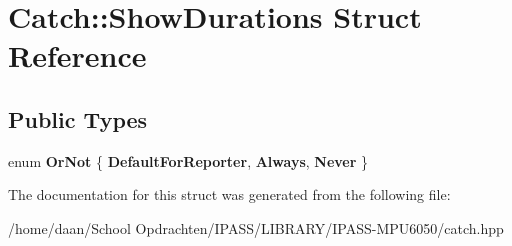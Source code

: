 \hypertarget{structCatch_1_1ShowDurations}{}\section{Catch\+:\+:Show\+Durations Struct Reference}
\label{structCatch_1_1ShowDurations}
\subsection*{Public Types}
\begin{DoxyCompactItemize}
\item 
\mbox{\label{structCatch_1_1ShowDurations_a82fa0174554187220c1eda175f122ee1}} 
enum {\bfseries Or\+Not} \{ {\bfseries Default\+For\+Reporter}, 
{\bfseries Always}, 
{\bfseries Never}
 \}
\end{DoxyCompactItemize}


The documentation for this struct was generated from the following file\+:\begin{DoxyCompactItemize}
\item 
/home/daan/\+School Opdrachten/\+I\+P\+A\+S\+S/\+L\+I\+B\+R\+A\+R\+Y/\+I\+P\+A\+S\+S-\/\+M\+P\+U6050/catch.\+hpp\end{DoxyCompactItemize}
